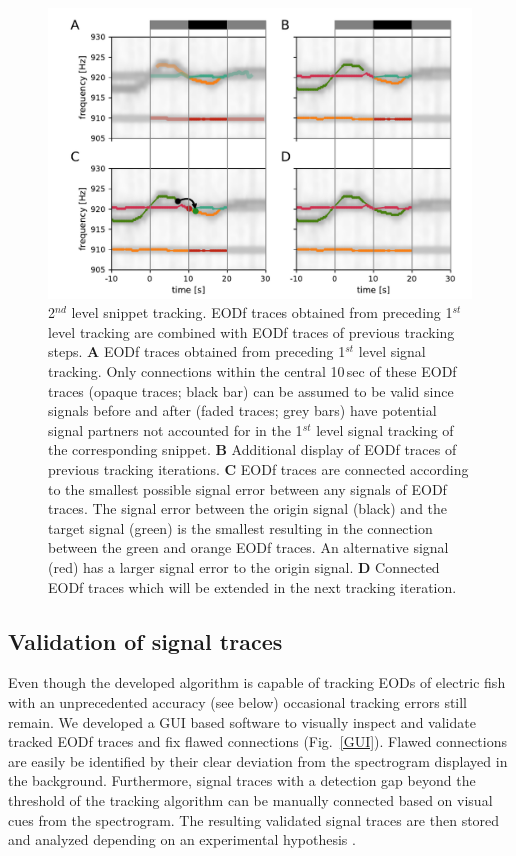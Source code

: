 \documentclass[11pt,pdftex]{article}
\newcommand{\figitem}[1]{\textsf{\bfseries\uppercase{#1}}\penalty10000 }
\newcommand{\fref}[1]{\textup{\ref{#1}}}
\newcommand{\fig}{Fig.}
\newcommand{\figref}[1]{\fig~\fref{#1}}
\begin{document}
\begin{figure}[h!]
  \centerline{\includegraphics[width=.9\linewidth]{assign_tmp_identities}}
  \caption{\label{running_connection} 2$^{nd}$ level snippet tracking. EODf traces obtained from preceding 1$^{st}$ level tracking are combined with EODf traces of previous tracking steps. \figitem{A} EODf traces obtained from preceding 1$^{st}$ level signal tracking. Only connections within the central 10\,sec of these EODf traces (opaque traces; black bar) can be assumed to be valid since signals before and after (faded traces; grey bars) have potential signal partners not accounted for in the 1$^{st}$ level signal tracking of the corresponding snippet. \figitem{B} Additional display of EODf traces of previous tracking iterations. \figitem{C} EODf traces are connected according to the smallest possible signal error between any signals of EODf traces. The signal error between the origin signal (black) and the target signal (green) is the smallest resulting in the connection between the green and orange EODf traces. An alternative signal (red) has a larger signal error to the origin signal. \figitem{D} Connected EODf traces which will be extended in the next tracking iteration. }
\end{figure}

\subsection{Validation of signal traces}

Even though the developed algorithm is capable of tracking EODs of electric fish with an unprecedented accuracy (see below) occasional tracking errors still remain. We developed a GUI based software to visually inspect and validate tracked EODf traces and fix flawed connections (\figref{GUI}). Flawed connections are easily be identified by their clear deviation from the spectrogram displayed in the background. Furthermore, signal traces with a detection gap beyond the threshold of the tracking algorithm can be manually connected based on visual cues from the spectrogram. The resulting validated signal traces are then stored and analyzed depending on an experimental hypothesis \citep{Raab2019, Raab2021}.
\end{document}
